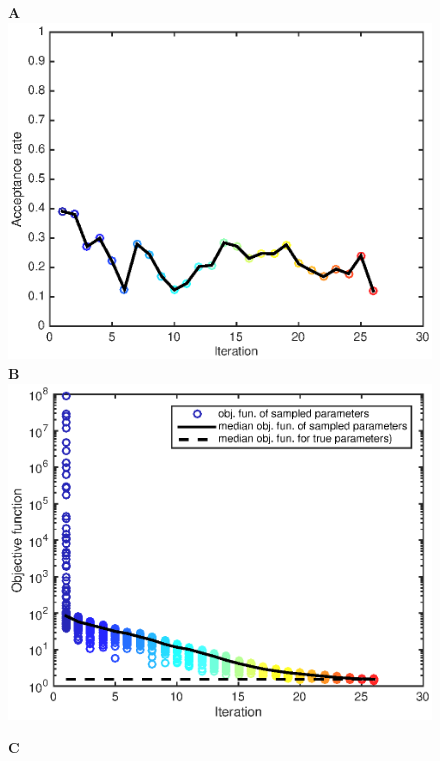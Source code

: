 \documentclass[10pt,letterpaper]{article}
\begin{document}
\begin{figure}[htbp]
\begin{minipage}[t]{0.33\textwidth}
\textbf{A}
\includegraphics[width=\textwidth]{Data/Tumor3dGCKI67ECM-acceptanceRate.eps}\\
\textbf{B}
\includegraphics[width=\textwidth]{Data/Tumor3dGCKI67ECM-objFunc.eps}
\end{minipage}
\begin{minipage}[t]{0.66\textwidth}
\textbf{C}\\

\end{minipage}
\end{figure}
\end{document}
